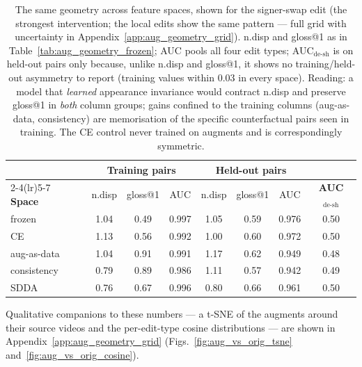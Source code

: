 \begin{table}[t]
\centering
\small
\setlength{\tabcolsep}{4.5pt}
\begin{tabular}{lccc ccc c}
\toprule
& \multicolumn{3}{c}{\textbf{Training pairs}} &
\multicolumn{3}{c}{\textbf{Held-out pairs}} & \\
\cmidrule(lr){2-4}\cmidrule(lr){5-7}
\textbf{Space} & n.disp & gloss@1 & AUC & n.disp & gloss@1 & AUC &
\textbf{AUC$_{\text{de-sh}}$} \\
\midrule
frozen      & 1.04 & 0.49 & 0.997 & 1.05 & 0.59 & 0.976 & 0.50 \\
CE          & 1.13 & 0.56 & 0.992 & 1.00 & 0.60 & 0.972 & 0.50 \\
aug-as-data & 1.04 & 0.91 & 0.991 & 1.17 & 0.62 & 0.949 & 0.48 \\
consistency & 0.79 & 0.89 & 0.986 & 1.11 & 0.57 & 0.942 & 0.49 \\
SDDA        & 0.76 & 0.67 & 0.996 & 0.80 & 0.66 & 0.961 & 0.50 \\
\bottomrule
\end{tabular}
\caption{The same geometry across feature spaces, shown for the
signer-swap edit (the strongest intervention; the local edits show the
same pattern --- full grid with uncertainty in
Appendix~\ref{app:aug_geometry_grid}). n.disp and gloss@1
as in Table~\ref{tab:aug_geometry_frozen}; AUC pools all four edit
types; AUC$_{\text{de-sh}}$ is on held-out
pairs only because, unlike n.disp and gloss@1, it shows no
training/held-out asymmetry to report (training values within $0.03$
in every space). Reading: a model that \emph{learned} appearance invariance would
contract n.disp and preserve gloss@1 in \emph{both} column groups;
gains confined to the training columns (aug-as-data, consistency) are
memorisation of the specific counterfactual pairs seen in training. The
CE control never trained on augments and is correspondingly symmetric.}
\label{tab:aug_geometry_spaces}
\end{table}


Qualitative companions to these numbers --- a t-SNE of the augments around their source videos and the per-edit-type cosine distributions --- are shown in Appendix~\ref{app:aug_geometry_grid} (Figs.~\ref{fig:aug_vs_orig_tsne} and~\ref{fig:aug_vs_orig_cosine}).




